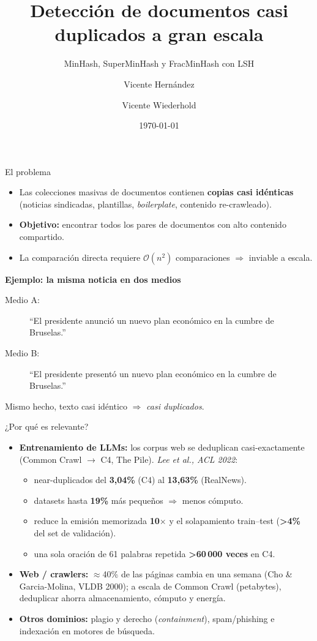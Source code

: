 \documentclass[aspectratio=169,11pt]{beamer}
\title[Dedup a gran escala]{Detección de documentos casi duplicados a gran escala}
\subtitle{MinHash, SuperMinHash y FracMinHash con LSH}
\author{Vicente Hernández \and Vicente Wiederhold}
\institute{Análisis de Grandes Volúmenes de Datos}
\date{\today}
\begin{document}
\begin{frame}
  \titlepage
\end{frame}

\begin{frame}{El problema}
  \begin{itemize}
    \item Las colecciones masivas de documentos contienen
          \textbf{copias casi idénticas} (noticias sindicadas, plantillas,
          \emph{boilerplate}, contenido re-crawleado).
    \item \textbf{Objetivo:} encontrar todos los pares de documentos con alto
          contenido compartido.
    \item La comparación directa requiere $\mathcal{O}(n^2)$ comparaciones
          $\Rightarrow$ inviable a escala.
  \end{itemize}
  \vfill
  \textbf{Ejemplo: la misma noticia en dos medios}
  \vspace{0.3em}
  \begin{description}
    \item[Medio A:] ``El presidente anunció un nuevo plan económico en la cumbre de Bruselas.''
    \item[Medio B:] ``El presidente presentó un nuevo plan económico en la cumbre de Bruselas.''
  \end{description}
  \vspace{0.2em}
  Mismo hecho, texto casi idéntico $\Rightarrow$ \emph{casi duplicados}.
\end{frame}

\begin{frame}{¿Por qué es relevante?}
  \small
  \begin{itemize}
    \item \textbf{Entrenamiento de LLMs:} los corpus web se deduplican
          casi-exactamente (Common Crawl $\to$ C4, The Pile).
          \textit{Lee et al., ACL 2022}:
          \begin{itemize}
            \item near-duplicados del \textbf{3{,}04\%} (C4) al \textbf{13{,}63\%} (RealNews).
            \item datasets hasta \textbf{19\%} más pequeños $\Rightarrow$ menos cómputo.
            \item reduce la emisión memorizada \textbf{10$\times$} y el solapamiento
                  train--test (\textbf{>4\%} del set de validación).
            \item una sola oración de 61 palabras repetida \textbf{>60\,000 veces} en C4.
          \end{itemize}
    \item \textbf{Web / crawlers:} $\approx$40\% de las páginas cambia en una semana
          (Cho \& Garcia-Molina, VLDB 2000); a escala de Common Crawl (petabytes),
          deduplicar ahorra almacenamiento, cómputo y energía.
    \item \textbf{Otros dominios:} plagio y derecho (\emph{containment}),
          spam/phishing e indexación en motores de búsqueda.
  \end{itemize}
\end{frame}
\end{document}
